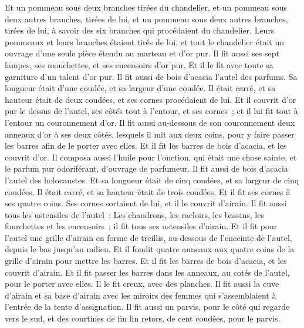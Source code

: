 \begin{multicols}{2}
Et un pommeau sous deux branches tirées du chandelier, et un pommeau sous deux autres branches, tirées de lui, et un pommeau sous deux autres branches, tirées de lui, à savoir des six branches qui procédaient du chandelier.
Leurs pommeaux et leurs branches étaient tirés de lui, et tout le chandelier était un ouvrage d'une seule pièce étendu au marteau et d'or pur.
Il fit aussi ses sept lampes, ses mouchettes, et ses encensoirs d'or pur.
Et il le fit avec toute sa garniture d'un talent d'or pur.
Il fit aussi de bois d'acacia l'autel des parfums. Sa longueur était d'une coudée, et sa largeur d'une coudée. Il était carré, et sa hauteur était de deux coudées, et ses cornes procédaient de lui.
 Et il couvrit d'or pur le dessus de l'autel, ses côtés tout à l'entour, et ses cornes~; et il lui fit tout à l'entour un couronnement d'or.
Il fit aussi au-dessous de son couronnement deux anneaux d'or à ses deux côtés, lesquels il mit aux deux coins, pour y faire passer les barres afin de le porter avec elles.
Et il fit les barres de bois d'acacia, et les couvrit d'or.
Il composa aussi l'huile pour l'onction, qui était une chose sainte, et le parfum pur odoriférant, d'ouvrage de parfumeur.
\VerseOne{}Il fit aussi de bois d'acacia l'autel des holocaustes. Et sa longueur était de cinq coudées, et sa largeur de cinq coudées. Il était carré, et sa hauteur était de trois coudées.
Et il fit ses cornes à ses quatre coins. Ses cornes sortaient de lui, et il le couvrit d'airain.
Il fit aussi tous les ustensiles de l'autel~: Les chaudrons, les racloirs, les bassins, les fourchettes et les encensoirs~; il fit tous ses ustensiles d'airain.
Et il fit pour l'autel une grille d'airain en forme de treillis, au-dessous de l'enceinte de l'autel, depuis le bas jusqu'au milieu.
Et il fondit quatre anneaux aux quatre coins de la grille d'airain pour mettre les barres.
 Et il fit les barres de bois d'acacia, et les couvrit d'airain.
Et il fit passer les barres dans les anneaux, au cotés de l'autel, pour le porter avec elles. Il le fit creux, avec des planches.
Il fit aussi la cuve d'airain et sa base d'airain avec les miroirs des femmes qui s'assemblaient à l'entrée de la tente d'assignation.
Il fit aussi un parvis, pour le côté qui regarde vers le sud, et des courtines de fin lin retors, de cent coudées, pour le parvis.

\end{multicols}
